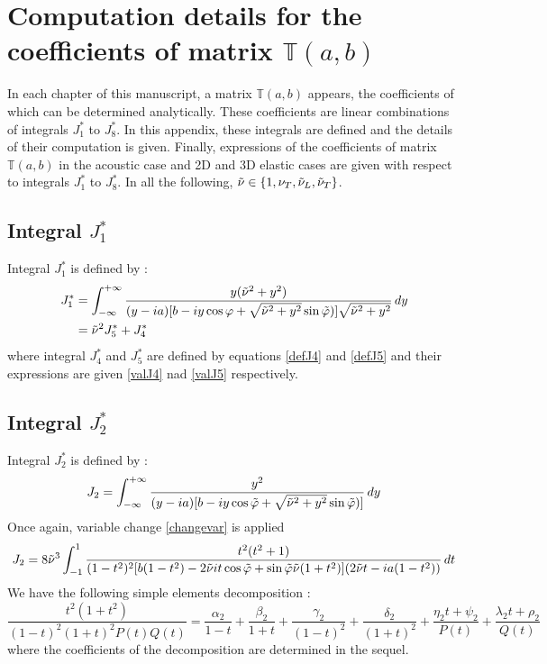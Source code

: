 \chapter{Computation details for the coefficients of matrix $\mathbb{T}(a,b)$}
\label{matT}
In each chapter of this manuscript, a matrix $\mathbb{T}(a,b)$ appears, the coefficients of which can be determined analytically. These coefficients are linear combinations of integrals $J_1^*$ to $J_8^*$. In this appendix, these integrals are defined and the details of their computation is given. Finally, expressions of the coefficients of matrix $\mathbb{T}(a,b)$ in the acoustic case and 2D and 3D elastic cases are given with respect to integrals $J_1^*$ to $J_8^*$. In all the following, $\tilde{\nu} \in \{1,\nu_T, \tilde{\nu}_L,\tilde{\nu}_T\}$.

\section{Integral $J_1^*$}
\label{calcJ1}
Integral $J_1^*$ is defined by :
\begin{equation}
\begin{split}
J_1^*&= \int_{-\infty}^{+\infty} \frac{y (\tilde{\nu}^2+y^2)}{(y-ia)\lbrack b-iy\cos \varphi+ \sqrt{\tilde{\nu}^2+y^2} \sin\tilde{\varphi}) \rbrack\sqrt{\tilde{\nu}^2+y^2}} \, dy\\
&=\tilde{\nu}^2J_5^*+J_4^*
\end{split}
\label{defJ1}
\end{equation}
where integral $J_4^*$ and $J_5^*$ are defined by equations \eqref{defJ4} and \eqref{defJ5} and their expressions are given \eqref{valJ4} nad \eqref{valJ5} respectively.

\section{Integral $J_2^*$}
\label{calcJ2}
Integral $J_2^*$ is defined by :
\begin{equation}
J_2 =\int_{-\infty}^{+\infty} \frac{y^2}{(y-ia)\lbrack b-iy\cos \tilde{\varphi}+ \sqrt{\tilde{\nu}^2+y^2} \sin \tilde{\varphi}) \rbrack} \, dy
\label{defJ2}
\end{equation}
Once again, variable change \eqref{changevar} is applied 
\begin{equation}
J_2=8\tilde{\nu}^3 \int_{-1}^1 \frac{t^2(t^2+1)}{(1-t^2)^2\lbrack b(1-t^2)-2\tilde{\nu} it\cos\tilde{\varphi}+ \sin \tilde{\varphi} \tilde{\nu}(1+t^2)\rbrack(2\tilde{\nu} t-ia(1-t^2))}\, dt
\end{equation}
We have the following simple elements decomposition :
\begin{equation}
\frac{t^2(1+t^2)}{(1-t)^2(1+t)^2P(t)Q(t)}=\frac{\alpha_2}{1-t}+\frac{\beta_2}{1+t}+\frac{\gamma_2}{(1-t)^2}+\frac{\delta_2}{(1+t)^2}+\frac{\eta_2 t+\psi_2}{P(t)}+\frac{\lambda_2 t +\rho_2}{Q(t)}
\label{decompJ2}
\end{equation}
where the coefficients of the decomposition are determined in the sequel.

